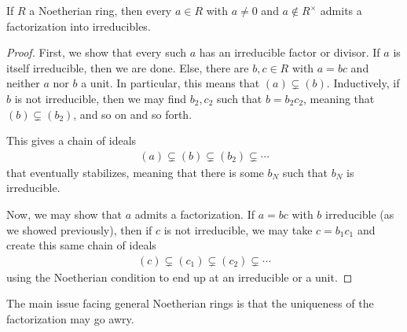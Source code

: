 \documentclass[10pt]{mypackage}
\begin{document}
\begin{proposition}
  If $R$ a Noetherian ring, then every $a\in R$ with $a\neq 0$ and $a\notin R^{\times}$ admits a factorization into irreducibles.
\end{proposition}
\begin{proof}
  First, we show that every such $a$ has an irreducible factor or divisor. If $a$ is itself irreducible, then we are done. Else, there are $b,c\in R$ with $a = bc$ and neither $a$ nor $b$ a unit. In particular, this means that $\left( a \right)\subsetneq \left( b \right)$. Inductively, if $b$ is not irreducible, then we may find $b_2,c_2$ such that $b = b_2 c_2$, meaning that $\left( b \right)\subsetneq \left( b_2 \right)$, and so on and so forth.%

  This gives a chain of ideals
  \begin{align*}
    \left( a \right)\subsetneq \left( b \right)\subsetneq \left( b_2 \right)\subsetneq \cdots
  \end{align*}
  that eventually stabilizes, meaning that there is some $b_N$ such that $b_N$ is irreducible.%

  Now, we may show that $a$ admits a factorization. If $a = bc$ with $b$ irreducible (as we showed previously), then if $c$ is not irreducible, we may take $c = b_1c_1$ and create this same chain of ideals
  \begin{align*}
    \left( c \right)\subsetneq \left( c_1 \right)\subsetneq \left( c_2 \right)\subsetneq\cdots
  \end{align*}
  using the Noetherian condition to end up at an irreducible or a unit.
\end{proof}
The main issue facing general Noetherian rings is that the uniqueness of the factorization may go awry.
\end{document}
